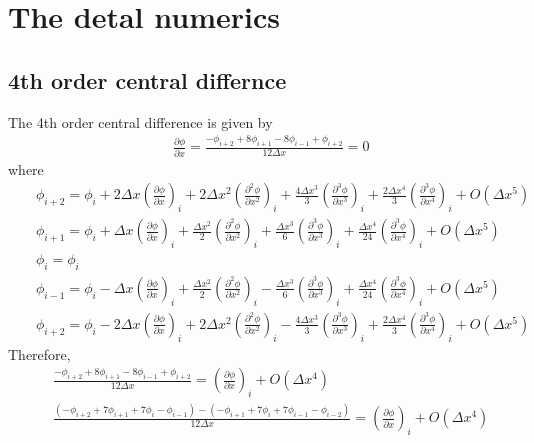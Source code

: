 
\appendix

\chapter{The detal numerics}
\section{4th order central differnce}
{
\footnotesize
The 4th order central difference is given by
\begin{eqnarray}
&& \frac{\partial \phi}{\partial x}
=\frac{-\phi_{i+2}+8\phi_{i+1}-8\phi_{i-1}+\phi_{i+2}}{12\Delta x} = 0
\end{eqnarray}
where
\begin{eqnarray}
&& \phi_{i+2} = \phi_{i}
+ 2 \Delta x \left(\frac{\partial \phi}{\partial x}\right)_{i}
+ 2 \Delta x^2 \left(\frac{\partial^2 \phi}{\partial x^2}\right)_{i}
+ \frac{4 \Delta x^3}{3} \left(\frac{\partial^3 \phi}{\partial x^3}\right)_{i}
+ \frac{2 \Delta x^4}{3} \left(\frac{\partial^3 \phi}{\partial x^4}\right)_{i}
+ O(\Delta x^5)\\
&& \phi_{i+1} = \phi_{i}
+ \Delta x \left(\frac{\partial \phi}{\partial x}\right)_{i}
+ \frac{\Delta x^2}{2} \left(\frac{\partial^2 \phi}{\partial x^2}\right)_{i}
+ \frac{\Delta x^3}{6} \left(\frac{\partial^3 \phi}{\partial x^3}\right)_{i}
+ \frac{\Delta x^4}{24} \left(\frac{\partial^3 \phi}{\partial x^4}\right)_{i}
+ O(\Delta x^5)\\
&& \phi_i = \phi_i\\
&& \phi_{i-1} = \phi_{i}
- \Delta x \left(\frac{\partial \phi}{\partial x}\right)_{i}
+ \frac{\Delta x^2}{2} \left(\frac{\partial^2 \phi}{\partial x^2}\right)_{i}
- \frac{\Delta x^3}{6} \left(\frac{\partial^3 \phi}{\partial x^3}\right)_{i}
+ \frac{\Delta x^4}{24} \left(\frac{\partial^3 \phi}{\partial x^4}\right)_{i}
+ O(\Delta x^5)\\
&& \phi_{i+2} = \phi_{i}
- 2 \Delta x \left(\frac{\partial \phi}{\partial x}\right)_{i}
+ 2 \Delta x^2 \left(\frac{\partial^2 \phi}{\partial x^2}\right)_{i}
- \frac{4 \Delta x^3}{3} \left(\frac{\partial^3 \phi}{\partial x^3}\right)_{i}
+ \frac{2 \Delta x^4}{3} \left(\frac{\partial^3 \phi}{\partial x^4}\right)_{i}
+ O(\Delta x^5)
\end{eqnarray}
Therefore,
\begin{eqnarray}
&&
\frac{-\phi_{i+2}+8\phi_{i+1}-8\phi_{i-1}+\phi_{i+2}}{12\Delta x}
= \left(\frac{\partial \phi}{\partial x}\right)_{i}+ O(\Delta x^4)\\
&&
\frac{(-\phi_{i+2}+7\phi_{i+1}+7\phi_{i}-\phi_{i-1})-
(-\phi_{i+1}+7\phi_{i}+7\phi_{i-1}-\phi_{i-2})}{12\Delta x}
= \left(\frac{\partial \phi}{\partial x}\right)_{i}+ O(\Delta x^4)
\end{eqnarray}


}
